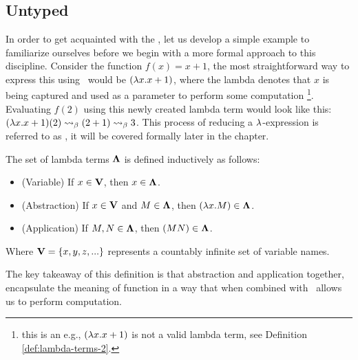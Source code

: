\documentclass[12pt]{book}
\begin{document}
\chapter{\lCalc}


\section{\centering Untyped \lCalc}
In order to get acquainted with the \lcalc, let us develop a simple example to familiarize ourselves before we begin with a more formal approach to this discipline. Consider the function $f(x) = x + 1$, the most straightforward way to express this using \lcalc \ would be $(\lambda x . x + 1 )$, where the lambda denotes that $x$ is being captured and used as a parameter to perform some computation \footnote{this is an e.g., $(\lambda x . x + 1 )$ is not a valid lambda term, see Definition \ref{def:lambda-terms-2}.}. Evaluating $f(2)$ using this newly created lambda term would look like this: $(\lambda x . x + 1)(2) \mathrel{\leadsto}_\beta (2 + 1) \mathrel{\leadsto}_\beta 3$. This process of reducing a $\lambda$-expression is referred to as \bred, it will be covered formally later in the chapter.
\begin{definition} The set of lambda terms \( \mathbf{\Lambda} \) is defined inductively as follows:
  \label{def:lambda-terms-1}
  \begin{itemize}
  \item (Variable) If \( x \in \mathbf{V} \), then \( x \in \mathbf{\Lambda} \).  
  \item (Abstraction) If \( x \in \mathbf{V} \) and \( M \in \mathbf{\Lambda} \), then \( (\lambda x. M) \in \mathbf{\Lambda} \).
  \item (Application) If \( M, N \in \mathbf{\Lambda} \), then \((M N) \in \mathbf{\Lambda} \).
  \end{itemize}
  Where $\mathbf{V} = \{x, y, z, ... \}$ represents a countably infinite set of variable names.
\end{definition}
The key takeaway of this definition is that abstraction and application together, encapsulate the meaning of function in a way that when combined with \bred \ allows us to perform computation.
\end{document}
